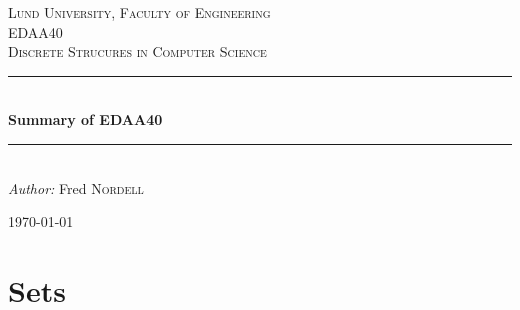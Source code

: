 \documentclass[12pt]{article} %
\begin{document}

\begin{titlepage}

\newcommand{\HRule}{\rule{\linewidth}{0.5mm}} %

\center %

\textsc{\LARGE Lund University, Faculty of Engineering}\\[1.5cm] %
\textsc{\Large EDAA40}\\[0.5cm] %
\textsc{\large Discrete Strucures in Computer Science}\\[0.5cm] %

\HRule \\[1cm]
{ \huge \bfseries Summary of EDAA40}\\[0.4cm] %
\HRule \\[1.5cm]

\emph{Author:} Fred \textsc{Nordell} %

{\large \today}\\[3cm] %


\vfill %

\end{titlepage}


\tableofcontents %
\lstlistoflistings %
\listoffigures %
\listoftables

\newpage %


\section{Sets} %
\end{document}
